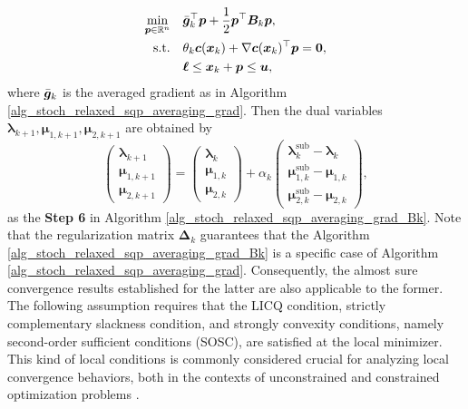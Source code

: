 \documentclass[aos]{imsart}
\numberwithin{equation}{section}
\theoremstyle{plain}
\begin{document}
 \begin{equation*}
    \begin{split}
        \min_{\bm{p} \in \mathbb{R}^{n}} & \hspace{1em} \Bar{\bm{g}}_{k}^{\top}\bm{p}+ \frac{1}{2}\bm{p}^{\top}\bm{B}_k\bm{p},\\
        \text{s.t.} & \hspace{1em} \theta_k \bm{c}(\bm{x}_k)+\nabla \bm{c}(\bm{x}_k)^{\top}\bm{p} = \bm{0},\\
        & \hspace{1em} \bm{\ell} \leq \bm{x}_k + \bm{p} \leq \bm{u},
    \end{split}    
\end{equation*} 
where $\Bar{\bm{g}}_{k}$ is the averaged gradient as in Algorithm \ref{alg_stoch_relaxed_sqp_averaging_grad}. Then the dual variables $\bm{\lambda}_{k+1}, \bm{\mu}_{1,k+1}, \bm{\mu}_{2,k+1}$ are obtained by
\begin{equation}
\label{update_dual}
    \left( \begin{array}{c}
         \bm{\lambda}_{k+1} \\
         \bm{\mu}_{1,k+1} \\
         \bm{\mu}_{2,k+1}
    \end{array} \right) = \left( \begin{array}{c}
         \bm{\lambda}_{k} \\
         \bm{\mu}_{1,k} \\
         \bm{\mu}_{2,k}
    \end{array} \right) + \alpha_k \left( \begin{array}{c}
         \bm{\lambda}_k^{\text{sub}} - \bm{\lambda}_{k} \\
         \bm{\mu}_{1,k}^{\text{sub}} - \bm{\mu}_{1,k} \\
         \bm{\mu}_{2,k}^{\text{sub}} - \bm{\mu}_{2,k}
    \end{array} \right),
\end{equation}
as the \textbf{Step 6} in Algorithm \ref{alg_stoch_relaxed_sqp_averaging_grad_Bk}.
Note that the regularization matrix $\bm{\Delta}_k$ guarantees that the Algorithm \ref{alg_stoch_relaxed_sqp_averaging_grad_Bk} is a specific case of Algorithm \ref{alg_stoch_relaxed_sqp_averaging_grad}. 
Consequently, the almost sure convergence results established for the latter are also applicable to the former. The following assumption requires that the LICQ condition, strictly complementary slackness condition, and strongly convexity conditions, namely second-order sufficient conditions (SOSC), are satisfied at the local minimizer. This kind of local conditions is commonly considered crucial for analyzing local convergence behaviors, both in the contexts of unconstrained and constrained optimization problems \cite{jorge2006numerical}.
\end{document}
